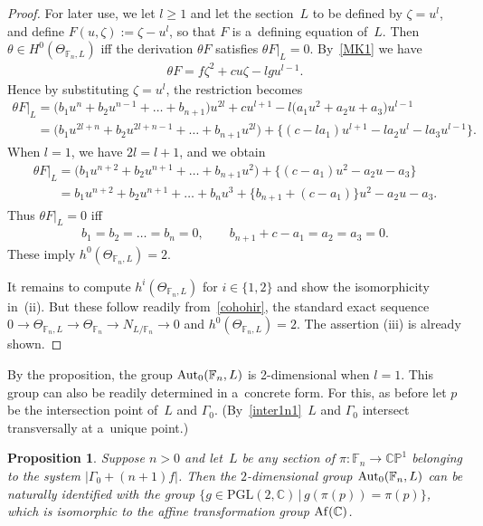 \documentclass[pdftex]{sigma}
\numberwithin{equation}{section}
\newtheorem{Proposition}[Theorem]{Proposition}
{\theoremstyle{definition}
\newtheorem{Definition}[Theorem]{Definition}
\newtheorem{Remark}[Theorem]{Remark}
}
\begin{document}
\begin{proof}
For later use, we let $l\ge 1$ and let the section~$L$ to be def\/ined by $\zeta = u^l$, and def\/ine $F(u,\zeta):=
\zeta - u^l$, so that $F$ is a~def\/ining equation of~$L$.
Then $\theta\in H^0(\Theta_{\mathbb{F}_n,L})$ if\/f the derivation $\theta F$ satisf\/ies $\theta F|_L = 0$.
By~\eqref{MK1} we have
\begin{gather*}
\theta F = f\zeta^2 + c u \zeta - lgu^{l-1}.
\end{gather*}
Hence by substituting $\zeta = u^l$, the restriction becomes
\begin{gather}
\theta F |_L = \big(b_1 u^n + b_2 u^{n-1} + \dots + b_{n+1}\big) u^{2l} + c u^{l+1} - l \big(a_1 u^2 + a_2 u + a_3\big) u^{l-1}
\nonumber
\\
\phantom{\theta F |_L}{}
= \big(b_1 u^{2l+n} + b_2 u^{2l+n-1} + \dots + b_{n+1}u^{2l}\big) + \big\{(c-la_1) u^{l+1} - la_2 u^l - la_3 u^{l-1}\big\}.
\label{der1}
\end{gather}
When $l=1$, we have $2l = l+1$, and we obtain
\begin{gather*}
\theta F|_L = \big(b_1 u^{n+2} + b_2 u^{n+1} + \dots + b_{n+1}u^{2}\big) + \big\{(c-a_1) u^{2} - a_2 u - a_3 \big\}
\\
\phantom{\theta F|_L}{}
= b_1 u^{n+2} + b_2 u^{n+1} + \dots + b_n u^3 + \{b_{n+1} + (c -a_1)\} u^2 - a_2 u - a_3.
\end{gather*}
Thus $\theta F|_L = 0$ if\/f{\samepage
\begin{gather*}
b_1=b_2=\dots=b_{n} = 0,
\qquad
b_{n+1} + c - a_1 = a_2 = a_3 = 0.
\end{gather*}
These imply $h^0(\Theta_{\mathbb{F}_n, L}) = 2$.}

It remains to compute $h^i(\Theta_{\mathbb{F}_n, L})$ for $i\in \{1,2\}$ and show the isomorphicity in~(ii).
But these follow readily from~\eqref{cohohir}, the standard exact sequence $ 0 \to \Theta_{\mathbb{F}_n, L} \to
\Theta_{\mathbb{F}_n} \to N_{L/\mathbb{F}_n}\to 0$ and $h^0(\Theta_{\mathbb{F}_n, L})=2$.
The assertion (iii) is already shown.
\end{proof}

By the proposition, the group ${\rm{Aut}}_0(\mathbb{F}_n,L)$ is 2-dimensional when $l=1$.
This group can also be readily determined in a~concrete form.
For this, as before let $p$ be the intersection point of~$L$ and $\Gamma_0$.
(By~\eqref{inter1n1}~$L$ and $\Gamma_0$ intersect transversally at a~unique point.)

\begin{Proposition}\label{prop:nonred}
Suppose $n>0$ and let~$L$ be any section of $\pi:\mathbb{F}_n\to \mathbb{CP}^1$ belonging to the system $|\Gamma_0+(n+1)f|$.
Then the $2$-dimensional group ${\rm{Aut}}_0(\mathbb{F}_n, L)$ can be naturally identified with
the group $\{g\in\mathrm{PGL}(2,\mathbb{C}) \,|\, g(\pi(p)) = \pi(p)\}$, which is isomorphic
to the affine transformation group ${\rm Af}(\mathbb{C})$.
\end{Proposition}
\end{document}
